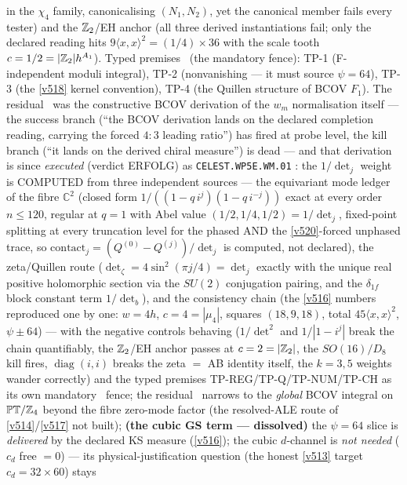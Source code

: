 in the $\chi_4$ family, canonicalising $(N_1,N_2)$, yet the canonical member fails every
tester) and the $\mathbb Z_2$/EH anchor (all three derived instantiations fail; only the declared
reading hits $9\langle x,x\rangle^2=(1/4)\times36$ with the scale tooth $c=1/2=|\mathbb Z_2|h^{A_1}$).
Typed premises \mC\ (the mandatory fence): TP-1 (F-independent moduli integral), TP-2
(nonvanishing --- it must source $\psi=64$), TP-3 (the \vref{v518} kernel convention), TP-4
(the Quillen structure of BCOV $F_1$). The residual \mO\ was the constructive BCOV derivation
of the $w_m$ normalisation itself --- the success branch (``the BCOV derivation lands on the
declared completion reading, carrying the forced $4{:}3$ leading ratio'') has fired at probe
level, the kill branch (``it lands on the derived chiral measure'') is dead --- and that
derivation is since \emph{executed} (verdict ERFOLG) as \texttt{CELEST.WP5E.WM.01}
: the $1/\det_j$ weight is COMPUTED from three
independent sources --- the equivariant mode ledger of the fibre $\mathbb C^2$ (closed form
$1/((1-q\,i^j)(1-q\,i^{-j}))$ exact at every order $n \le 120$, regular at $q = 1$ with Abel
value $(1/2, 1/4, 1/2) = 1/\det_j$, fixed-point splitting at every truncation level for the
phased AND the \vref{v520}-forced unphased trace, so
$\mathrm{contact}_j = (Q^{(0)}-Q^{(j)})/\det_j$ is computed, not declared), the zeta/Quillen
route ($\det_\zeta = 4\sin^2(\pi j/4) = \det_j$ exactly with the unique real positive
holomorphic section via the $SU(2)$ conjugation pairing, and the $\delta_{1f}$ block constant
term $1/\det_b$), and the consistency chain (the \vref{v516} numbers reproduced one by one:
$w = 4h$, $c = 4 = |\mu_4|$, squares $(18, 9, 18)$, total $45\langle x,x\rangle^2$,
$\psi \pm 64$) --- with the negative controls behaving ($1/\det^2$ and $1/|1-i^j|$ break the
chain quantifiably, the $\mathbb Z_2$/EH anchor passes at $c = 2 = |\mathbb Z_2|$, the $SO(16)/D_8$ kill
fires, $\operatorname{diag}(i,i)$ breaks the zeta $=$ AB identity itself, the $k = 3, 5$
weights wander correctly) and the typed premises TP-REG/TP-Q/TP-NUM/TP-CH as its own
mandatory \mC\ fence; the residual \mO\ narrows to the \emph{global} BCOV integral on
$\mathbb{PT}/\mathbb Z_4$ beyond the fibre zero-mode factor (the resolved-ALE route of
\vref{v514}/\vref{v517} not built);
\textbf{(the cubic GS
term --- dissolved)} the $\psi=64$ slice is \emph{delivered} by the declared KS measure
(\vref{v516}); the cubic $d$-channel is \emph{not needed} ($c_d$ free $=0$) --- its
physical-justification question (the honest \vref{v513} target $c_d=32\times60$) stays
